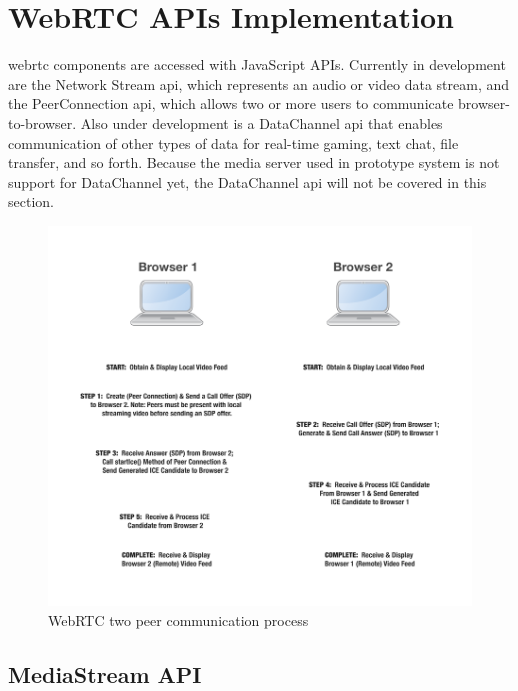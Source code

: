 \section{WebRTC APIs Implementation}

\noindent \gls{webrtc} components are accessed with JavaScript APIs. Currently in development are the Network Stream \gls{api}, which represents an audio or video data stream, and the PeerConnection \gls{api}, which allows two or more users to communicate browser-to-browser. Also under development is a DataChannel \gls{api} that enables communication of other types of data for real-time gaming, text chat, file transfer, and so forth. Because the media server used in prototype system is not support for DataChannel yet, the DataChannel \gls{api} will not be covered in this section.

\begin{figure}
	\centering
    	\includegraphics[height=0.50\textheight,natwidth=610,natheight=642]{figs/webrtc_diagram.png}
  	\caption{WebRTC two peer communication process\cite{mdn:p2pwebrtc}}
  	\label{fig:webrtc_diagram}
\end{figure}

\subsection{MediaStream API}

